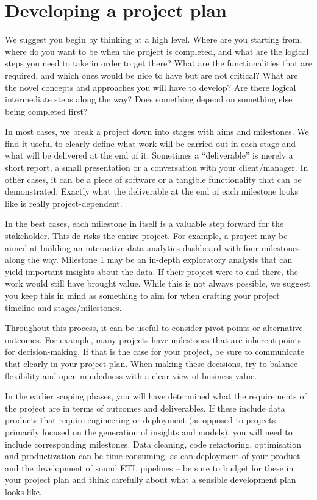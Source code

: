 \documentclass[
]{book}
\begin{document}
\hypertarget{developing-a-project-plan}{%
\section{Developing a project plan}\label{developing-a-project-plan}}

We suggest you begin by thinking at a high level. Where are you starting from, where do you want to be when the project is completed, and what are the logical steps you need to take in order to get there? What are the functionalities that are required, and which ones would be nice to have but are not critical? What are the novel concepts and approaches you will have to develop? Are there logical intermediate steps along the way? Does something depend on something else being completed first?

In most cases, we break a project down into stages with aims and milestones. We find it useful to clearly define what work will be carried out in each stage and what will be delivered at the end of it. Sometimes a ``deliverable'' is merely a short report, a small presentation or a conversation with your client/manager. In other cases, it can be a piece of software or a tangible functionality that can be demonstrated. Exactly what the deliverable at the end of each milestone looks like is really project-dependent.

In the best cases, each milestone in itself is a valuable step forward for the stakeholder. This de-risks the entire project. For example, a project may be aimed at building an interactive data analytics dashboard with four milestones along the way. Milestone 1 may be an in-depth exploratory analysis that can yield important insights about the data. If their project were to end there, the work would still have brought value. While this is not always possible, we suggest you keep this in mind as something to aim for when crafting your project timeline and stages/milestones.

Throughout this process, it can be useful to consider pivot points or alternative outcomes. For example, many projects have milestones that are inherent points for decision-making. If that is the case for your project, be sure to communicate that clearly in your project plan. When making these decisions, try to balance flexibility and open-mindedness with a clear view of business value.

In the earlier scoping phases, you will have determined what the requirements of the project are in terms of outcomes and deliverables. If these include data products that require engineering or deployment (as opposed to projects primarily focused on the generation of insights and models), you will need to include corresponding milestones. Data cleaning, code refactoring, optimisation and productization can be time-consuming, as can deployment of your product and the development of sound ETL pipelines -- be sure to budget for these in your project plan and think carefully about what a sensible development plan looks like.
\end{document}
